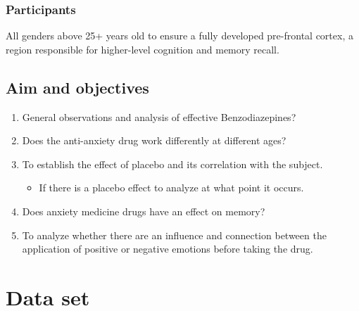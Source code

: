 \documentclass{article}
\begin{document}
    \subsubsection{Participants}
    All genders above 25+ years old to ensure a fully developed pre-frontal cortex, a region responsible for higher-level cognition and memory recall.
    \subsection{Aim and objectives}\label{subsec:aim-and-objectives}
    \begin{enumerate}
        \item     General observations and analysis of effective Benzodiazepines?
        \item     Does the anti-anxiety drug work differently at different ages?
        \item     To establish the effect of placebo and its correlation with the subject.
        \begin{itemize}
            \item If there is a placebo effect to analyze at what point it occurs.
        \end{itemize}
        \item     Does anxiety medicine drugs have an effect on memory?
        \item     To analyze whether there are an influence and connection between the application of positive or negative emotions before taking the drug.
    \end{enumerate}
    \newpage




    \section{Data set}
\end{document}

